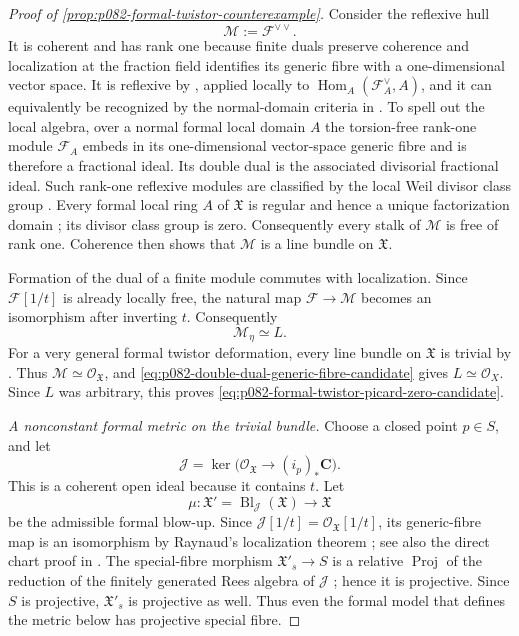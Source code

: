 \begin{proof}[Proof of
\cref{prop:p082-formal-twistor-counterexample}]
Consider the reflexive hull
\[
             \mathcal M:=\mathcal F^{\vee\vee}.
\]
It is coherent and has rank one because finite duals preserve coherence and
localization at the fraction field identifies its generic fibre with a
one-dimensional vector space.  It is reflexive by
\cite[Tag~0AV3]{StacksProject}, applied locally to
$\operatorname{Hom}_A(\mathcal F_A^\vee,A)$, and it can equivalently be
recognized by the normal-domain criteria in
\cite[Tags~0AVB and 0AVC]{StacksProject}.  To spell out the local algebra,
over a normal formal local domain $A$ the torsion-free rank-one module
$\mathcal F_A$ embeds in its one-dimensional vector-space generic fibre
and is therefore a fractional ideal.  Its double dual is the associated
divisorial fractional ideal.  Such
rank-one reflexive modules
are classified by the local Weil divisor class group
\cite[Tag~0EBM]{StacksProject}.  Every formal local ring $A$ of
$\mathfrak X$ is regular and hence a unique factorization domain
\cite[Tag~0AG0]{StacksProject}; its divisor class group is zero.
Consequently every stalk of $\mathcal M$ is free of rank one.  Coherence
then shows that $\mathcal M$ is a line bundle on $\mathfrak X$.

Formation of the dual of a finite module commutes with localization.
Since $\mathcal F[1/t]$ is already locally free, the natural map
$\mathcal F\to\mathcal M$ becomes an isomorphism after inverting $t$.
Consequently
\begin{equation}\label{eq:p082-double-dual-generic-fibre-candidate}
                         \mathcal M_\eta\simeq L.
\end{equation}
For a very general formal twistor deformation, every line bundle on
$\mathfrak X$ is trivial by
\cite[Proposition~2.10(i)]{HMS09Orientation}.  Thus
$\mathcal M\simeq\mathcal O_{\mathfrak X}$, and
\eqref{eq:p082-double-dual-generic-fibre-candidate} gives
$L\simeq\mathcal O_X$.  Since $L$ was arbitrary, this proves
\eqref{eq:p082-formal-twistor-picard-zero-candidate}.

\emph{A nonconstant formal metric on the trivial bundle.}
Choose a closed point $p\in S$, and let
\[
 \mathcal J=\ker\bigl(
       \mathcal O_{\mathfrak X}\longrightarrow (i_p)_*\mathbf C
                         \bigr).
\]
This is a coherent open ideal because it contains $t$.  Let
\[
       \mu\colon\mathfrak X'
          =\operatorname{Bl}_{\mathcal J}(\mathfrak X)
          \longrightarrow\mathfrak X
\]
be the admissible formal blow-up.  Since
$\mathcal J[1/t]=\mathcal O_{\mathfrak X}[1/t]$, its generic-fibre map is
an isomorphism by Raynaud's localization theorem
\cite[Exercise~5.3.2.3 and Fact~5.3.3.1]{Temkin12Introduction}; see also
the direct chart proof
in \cite[\S8.4, Proposition~2]{Bosch14FormalRigid}.  The special-fibre morphism
$\mathfrak X'_s\to S$ is a relative $\operatorname{Proj}$ of the
reduction of the finitely generated Rees algebra of $\mathcal J$
\cite[Tags~052P, 0804, and 01OF]{StacksProject};
hence it is projective.  Since $S$ is projective,
$\mathfrak X'_s$ is projective as well.  Thus even the formal model that
defines the metric below has projective special fibre.


\end{proof}
